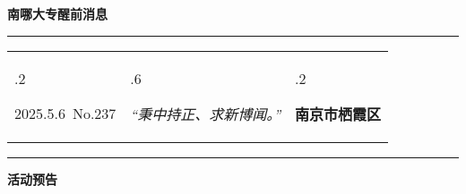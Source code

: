 \documentclass[letterpaper, 12pt]{article}
\begin{document}
\begin{center}
    \Huge\textbf{南哪大专醒前消息}
\end{center}
\vspace{4mm}
\hrule
\renewcommand\tabularxcolumn[1]{m{#1}}
\begin{tabularx}{\textwidth}{>{\hsize.2\hsize}X>{\hsize.6\hsize}X>{\hsize.2\hsize}X}
    \begin{flushleft}
        2025.5.6\, No.237
    \end{flushleft}
    &
    \begin{center}
        \textit{“秉中持正、求新博闻。”}
    \end{center}
    &
    \begin{flushright}
        \textbf{南京市栖霞区}
    \end{flushright}
\end{tabularx}
\vspace{-3.5mm}
\hrule
\vspace{4mm}
\centerline{\huge\textbf{活动预告}}
\end{document}
